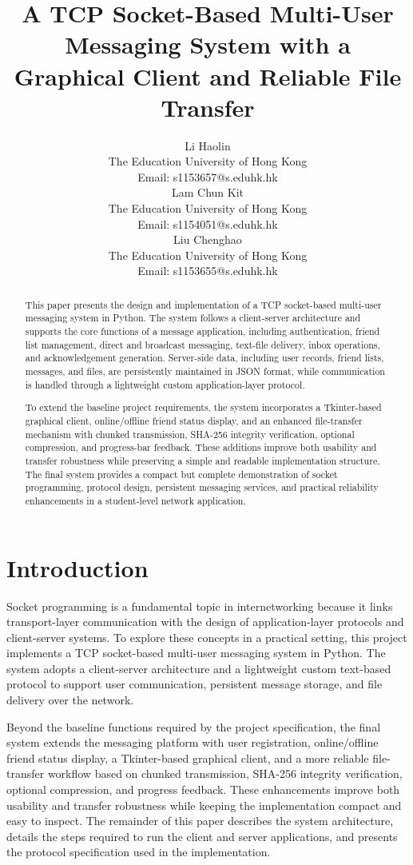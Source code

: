 \documentclass[conference]{IEEEtran}
\title{A TCP Socket-Based Multi-User Messaging System with a Graphical Client and Reliable File Transfer}
\author{
	\begin{minipage}[t]{0.30\textwidth}
		\centering
		Li Haolin\\
		The Education University of Hong Kong\\
		Email: s1153657@s.eduhk.hk
	\end{minipage}
	\hfill
	\begin{minipage}[t]{0.30\textwidth}
		\centering
		Lam Chun Kit\\
		The Education University of Hong Kong\\
		Email: s1154051@s.eduhk.hk
	\end{minipage}
	\hfill
	\begin{minipage}[t]{0.30\textwidth}
		\centering
		Liu Chenghao\\
		The Education University of Hong Kong\\
		Email: s1153655@s.eduhk.hk
	\end{minipage}
}
\begin{document}
	
	\maketitle
	\thispagestyle{plain}
	\pagestyle{plain}

\begin{abstract}
	This paper presents the design and implementation of a TCP socket-based multi-user messaging system in Python. The system follows a client-server architecture and supports the core functions of a message application, including authentication, friend list management, direct and broadcast messaging, text-file delivery, inbox operations, and acknowledgement generation. Server-side data, including user records, friend lists, messages, and files, are persistently maintained in JSON format, while communication is handled through a lightweight custom application-layer protocol.
	
	To extend the baseline project requirements, the system incorporates a Tkinter-based graphical client, online/offline friend status display, and an enhanced file-transfer mechanism with chunked transmission, SHA-256 integrity verification, optional compression, and progress-bar feedback. These additions improve both usability and transfer robustness while preserving a simple and readable implementation structure. The final system provides a compact but complete demonstration of socket programming, protocol design, persistent messaging services, and practical reliability enhancements in a student-level network application.
\end{abstract}


\section{Introduction}

Socket programming is a fundamental topic in internetworking because it links transport-layer communication with the design of application-layer protocols and client-server systems. To explore these concepts in a practical setting, this project implements a TCP socket-based multi-user messaging system in Python. The system adopts a client-server architecture and a lightweight custom text-based protocol to support user communication, persistent message storage, and file delivery over the network.

Beyond the baseline functions required by the project specification, the final system extends the messaging platform with user registration, online/offline friend status display, a Tkinter-based graphical client, and a more reliable file-transfer workflow based on chunked transmission, SHA-256 integrity verification, optional compression, and progress feedback. These enhancements improve both usability and transfer robustness while keeping the implementation compact and easy to inspect. The remainder of this paper describes the system architecture, details the steps required to run the client and server applications, and presents the protocol specification used in the implementation.
\end{document}
